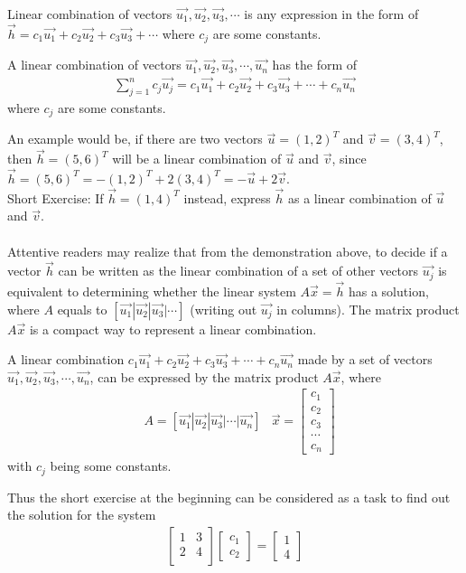 Linear combination of vectors $\vec{u_1}, \vec{u_2}, \vec{u_3}, \cdots$ is any expression in the form of $\vec{h} = c_1\vec{u_1} + c_2\vec{u_2} + c_3\vec{u_3} + \cdots$ where $c_j$ are some constants. 
\begin{defn}
A linear combination of vectors $\vec{u_1}, \vec{u_2}, \vec{u_3}, \cdots, \vec{u_n}$ has the form of
\begin{align*}
\sum_{j=1}^n c_j\vec{u_j} = c_1\vec{u_1} + c_2\vec{u_2} + c_3\vec{u_3} + \cdots + c_n\vec{u_n}
\end{align*}
where $c_j$ are some constants.
\end{defn}
An example would be, if there are two vectors $\vec{u} = (1,2)^T$ and $\vec{v} = (3,4)^T$, then $\vec{h} = (5,6)^T$ will be a linear combination of $\vec{u}$ and $\vec{v}$, since $\vec{h} = (5,6)^T = -(1,2)^T + 2(3,4)^T = -\vec{u} + 2\vec{v}$.\\
Short Exercise: If $\vec{h} = (1,4)^T$ instead, express $\vec{h}$ as a linear combination of $\vec{u}$ and $\vec{v}$.\\
\\
Attentive readers may realize that from the demonstration above, to decide if a vector $\vec{h}$ can be written as the linear combination of a set of other vectors $\vec{u_j}$ is equivalent to determining whether the linear system $A\vec{x} = \vec{h}$ has a solution, where $A$ equals to $[\vec{u_1}|\vec{u_2}|\vec{u_3}|\cdots]$ (writing out $\vec{u_j}$ in columns). The matrix product $A\vec{x}$ is a compact way to represent a linear combination.
\begin{proper}
\label{linearcombmatrix}
A linear combination $c_1\vec{u_1} + c_2\vec{u_2} + c_3\vec{u_3} + \cdots + c_n\vec{u_n}$ made by a set of vectors $\vec{u_1}, \vec{u_2}, \vec{u_3}, \cdots, \vec{u_n}$, can be expressed by the matrix product $A\vec{x}$, where
\begin{align*}
&A = [\vec{u_1}|\vec{u_2}|\vec{u_3}|\cdots|\vec{u_n}]
&\vec{x} =
\begin{bmatrix}
c_1 \\
c_2 \\
c_3 \\
\cdots \\
c_n
\end{bmatrix}
\end{align*}
with $c_j$ being some constants.
\end{proper}
Thus the short exercise at the beginning can be considered as a task to find out the solution for the system
\begin{align*}
\begin{bmatrix}
1 & 3 \\
2 & 4 \\
\end{bmatrix}
\begin{bmatrix}
c_1 \\
c_2
\end{bmatrix} =
\begin{bmatrix}
1 \\
4
\end{bmatrix}
\end{align*}

